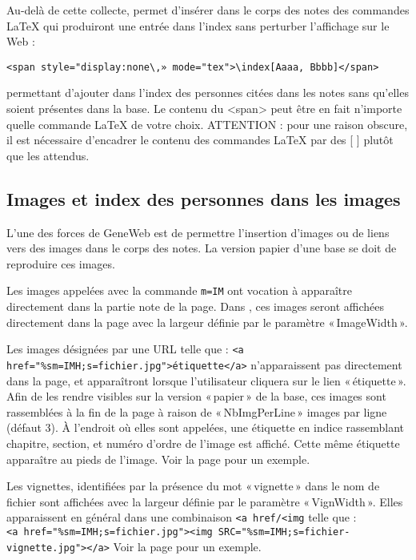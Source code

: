 Au-delà de cette collecte, \gwtol{} permet d'insérer dans le corps des notes
des commandes \LaTeX{} qui produiront une entrée dans l'index sans perturber
l'affichage sur le Web :
\begin{verbatim}
<span style="display:none\,» mode="tex">\index[Aaaa, Bbbb]</span>
\end{verbatim}
permettant d'ajouter dans l'index des personnes citées dans les notes
sans qu'elles soient présentes dans la base.
Le contenu du <span> peut être en fait n'importe quelle commande LaTeX de votre choix.
ATTENTION : pour une raison obscure, il est nécessaire d'encadrer le
contenu des commandes \LaTeX{} par des [ ] plutôt que les { } attendus.

\subsection{Images et index des personnes dans les images}

L'une des forces de GeneWeb est de permettre l'insertion d'images ou de
liens vers des images dans le corps des notes. La version papier d'une base
se doit de reproduire ces images.

Les images appelées avec la commande \verb|m=IM| ont vocation à apparaître
directement dans la partie note de la page. Dans \gwtol{}, ces images seront
affichées directement dans la page avec la largeur définie par
le paramètre «\,ImageWidth\,».

Les images désignées par une URL telle que :
\verb|<a href="%sm=IMH;s=fichier.jpg">étiquette</a>| n'apparaissent pas
directement dans la page, et apparaîtront lorsque l'utilisateur cliquera
sur le lien «\,étiquette\,». Afin de les rendre visibles sur la
version «\,papier\,» de la base, ces images sont rassemblées à la fin
de la page à raison de «\,NbImgPerLine\,» images par ligne (défaut 3).
À l'endroit où elles sont appelées, une étiquette en indice rassemblant
chapitre, section, et numéro d'ordre de l'image est affiché. Cette même 
étiquette apparaître au pieds de l'image.
Voir la page \pageref{leondupont} pour un exemple.

Les vignettes, identifiées par la présence du mot «\,vignette\,» dans
le nom de fichier sont affichées avec la largeur définie par le paramètre
«\,VignWidth\,». Elles apparaissent en général dans une combinaison
\verb|<a href/<img| telle que : \\
\verb|<a href="%sm=IMH;s=fichier.jpg"><img SRC="%sm=IMH;s=fichier-vignette.jpg"></a>|
Voir la page \pageref{leondupont} pour un exemple.

